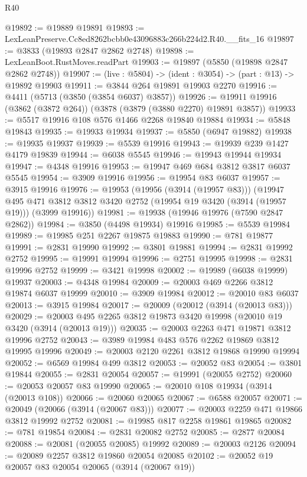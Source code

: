 \begin{lexlean}{R40}
\begin{coremodule}
@19892 := @19889 @19891
@19893 := LexLeanPreserve.Cc8ed8262bcbb0e43096883c266b224d2.R40.__fits_16
@19897 := @3833 (@19893 @2847 @2862 @2748)
@19898 := LexLeanBoot.RustMoves.readPart
@19903 := @19897 (@5850 (@19898 @2847 @2862 @2748))
@19907 := (live : @5804) -> (ident : @3054) -> (part : @13) -> @19892 @19903
@19911 := @3844 @264 @19891 @19903 @2270
@19916 := @4411 (@5713 (@3850 (@3854 @6037) @3857))
@19926 := @19911 @19916 (@3862 (@3872 @264)) (@3878 (@3879 (@3880 @2270) @19891 @3857))
@19933 := @5517 @19916 @108 @576 @1466 @2268 @19840 @19884
@19934 := @5848 @19843
@19935 := @19933 @19934
@19937 := @5850 (@6947 @19882)
@19938 := @19935 @19937
@19939 := @5539 @19916
@19943 := @19939 @239 @1427 @4179 @19839
@19944 := @6038 @5545
@19946 := @19943 @19944 @19934
@19947 := @4348 @19916
@19953 := @19947 @469 @684 @3812 @3817 @6037 @5545
@19954 := @3909 @19916
@19956 := @19954 @83 @6037
@19957 := @3915 @19916
@19976 := @19953
    (@19956 (@3914 (@19957 @83)))
    (@19947
      @495
      @471
      @3812
      @3812
      @3420
      @2752
      (@19954 @19 @3420 (@3914 (@19957 @19)))
      (@3999 @19916))
@19981 := @19938 (@19946 @19976 (@7590 @2847 @2862))
@19984 := @3850 (@4498 @19934) @19916
@19985 := @5539 @19984
@19989 := @19985 @251 @2267 @19875 @19883
@19990 := @781 @19877
@19991 := @2831 @19990
@19992 := @3801 @19881
@19994 := @2831 @19992 @2752
@19995 := @19991 @19994
@19996 := @2751 @19995
@19998 := @2831 @19996 @2752
@19999 := @3421 @19998
@20002 := @19989 (@6038 @19999) @19937
@20003 := @4348 @19984
@20009 := @20003 @469 @2266 @3812 @19874 @6037 @19999
@20010 := @3909 @19984
@20012 := @20010 @83 @6037
@20013 := @3915 @19984
@20017 := @20009 (@20012 (@3914 (@20013 @83)))
@20029 := @20003 @495 @2265 @3812 @19873 @3420 @19998 (@20010 @19 @3420 (@3914 (@20013 @19)))
@20035 := @20003 @2263 @471 @19871 @3812 @19996 @2752
@20043 := @3989 @19984 @483 @576 @2262 @19869 @3812 @19995 @19996
@20049 := @20003 @2120 @2261 @3812 @19868 @19990 @19994
@20052 := @6569 @19984 @499 @3812
@20053 := @20052 @83
@20054 := @3801 @19844
@20055 := @2831 @20054
@20057 := @19991 (@20055 @2752)
@20060 := @20053 @20057 @83 @19990
@20065 := @20010 @108 @19934 (@3914 (@20013 @108))
@20066 := @20060 @20065
@20067 := @6588 @20057
@20071 := @20049 (@20066 (@3914 (@20067 @83)))
@20077 := @20003 @2259 @471 @19866 @3812 @19992 @2752
@20081 := @19985 @817 @2258 @19861 @19865
@20082 := @781 @19854
@20084 := @2831 @20082 @2752
@20085 := @2877 @20084
@20088 := @20081 (@20055 @20085) @19992
@20089 := @20003 @2126
@20094 := @20089 @2257 @3812 @19860 @20054 @20085
@20102 := @20052 @19 @20057 @83 @20054 @20065 (@3914 (@20067 @19))

\end{coremodule}
\end{lexlean}

